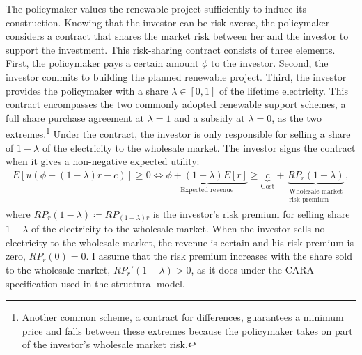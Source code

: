 \documentclass[12pt]{article}
\theoremstyle{definition} %
\begin{document}
The policymaker values the renewable project sufficiently to induce its construction. Knowing that the investor can be risk-averse, the policymaker considers a contract that shares the market risk between her and the investor to support the investment. This risk-sharing contract consists of three elements. First, the policymaker pays a certain amount $\phi$ to the investor. Second, the investor commits to building the planned renewable project. Third, the investor provides the policymaker with a share $\lambda \in [0,1] $ of the lifetime electricity. This contract encompasses the two commonly adopted renewable support schemes, a full share purchase agreement at $\lambda = 1 $ and a subsidy at $\lambda = 0 $, as the two extremes.\footnote{
Another common scheme, a contract for differences, guarantees a minimum price and falls between these extremes because the policymaker takes on part of the investor's wholesale market risk.
} Under the contract, the investor is only responsible for selling a share of $1 - \lambda $ of the electricity to the wholesale market. The investor signs the contract when it gives a non-negative expected utility:
\begin{align}
\label{eq:contract}
E[u(\phi + (1-\lambda) r - c)] \geq 0 \iff \underbrace{\phi + (1-\lambda) E[r]}_{\text{Expected revenue}} \geq \underbrace{c}_{\text{Cost}} + \underbrace{RP_r(1-\lambda)}_{\substack{\text{Wholesale market} \\ \text{risk premium}}},
\end{align}
where $RP_r(1-\lambda) \coloneqq RP_{(1-\lambda)r} $ is the investor's risk premium for selling share $1 - \lambda $ of the electricity to the wholesale market. When the investor sells no electricity to the wholesale market, the revenue is certain and his risk premium is zero, \(RP_r(0)=0\). I assume that the risk premium increases with the share sold to the wholesale market, \(RP_r'(1-\lambda)>0\), as it does under the CARA specification used in the structural model.
\end{document}
